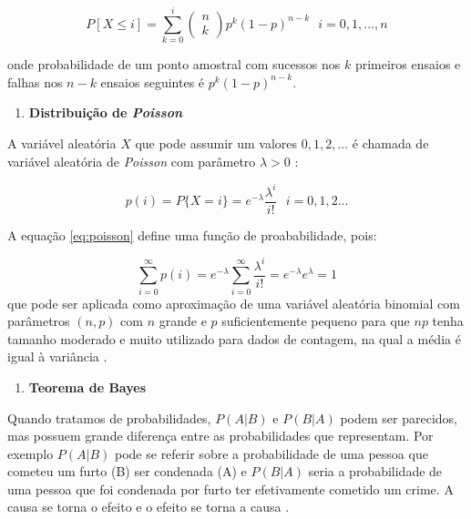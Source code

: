 \documentclass[
  openany]{book}
\providecommand{\tightlist}{%
  \setlength{\itemsep}{0pt}\setlength{\parskip}{0pt}}
\begin{document}
\begin{equation}
    P[X\leq i]=\displaystyle \sum_{k=0}^i \begin{pmatrix}n\\k \end{pmatrix}p^k(1-p)^{n-k} \ \ \ i=0,1,...,n
    \label{eq:fbinominal}
\end{equation}

onde probabilidade de um ponto amostral com sucessos nos \(k\) primeiros ensaios e falhas nos \(n−k\) ensaios seguintes é \(p^k(1−p)^{n−k}\).

\begin{enumerate}
\def\labelenumi{\arabic{enumi}.}
\setcounter{enumi}{6}
\tightlist
\item
  \textbf{Distribuição de \emph{Poisson}}
\end{enumerate}

A variável aleatória \(X\) que pode assumir um valores \(0,1,2,...\) é chamada de variável aleatória de \emph{Poisson} com parâmetro \(\lambda>0\) \citep{rossprobability}:

\begin{equation}
    p(i)=P\{X=i\}=e^{-\lambda}\frac{\lambda^i}{i!} \ \ \ i=0,1,2...
    \label{eq:poisson}
\end{equation}

A equação \eqref{eq:poisson} define uma função de proababilidade, pois:

\[\displaystyle \sum^\infty_{i=0}p(i)=e^{-\lambda}\sum^\infty_{i=0} \frac{\lambda^i}{i!} = e^{-\lambda}e^\lambda=1\]
que pode ser aplicada como aproximação de uma variável aleatória binomial com parâmetros \((n,p)\) com \(n\) grande e \(p\) suficientemente pequeno para que \(np\) tenha tamanho moderado e muito utilizado para dados de contagem, na qual a média é igual à variância \citep{banzatto1992experimentaccao}.

\begin{enumerate}
\def\labelenumi{\arabic{enumi}.}
\setcounter{enumi}{7}
\tightlist
\item
  \textbf{Teorema de Bayes}
\end{enumerate}

Quando tratamos de probabilidades, \(P(A|B)\) e \(P(B|A)\) podem ser parecidos, mas possuem grande diferença entre as probabilidades que representam. Por exemplo \(P(A|B)\) pode se referir sobre a probabilidade de uma pessoa que cometeu um furto (B) ser condenada (A) e \(P(B|A)\) seria a probabilidade de uma pessoa que foi condenada por furto ter efetivamente cometido um crime. A causa se torna o efeito e o efeito se torna a causa \citep{freund2009estatistica}.
\end{document}

